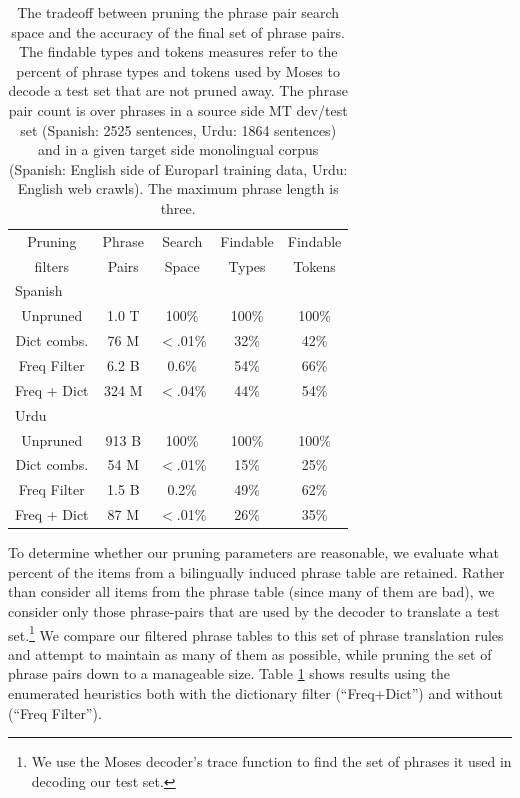 \documentclass[11pt]{article}
\begin{document}
\begin{table}
\small
\begin{center}
\begin{tabular}{|c|c|c|c|c|}
\hline
Pruning 	& Phrase	& Search & 	Findable 	& Findable \\
filters	& Pairs	&  Space & Types 	&  Tokens \\
\hline
\hline
\multicolumn{5}{|l|}{Spanish} \\
\hline
Unpruned & 1.0 T & 100\% & 100\% & 100\% \\
Dict combs. & 76 M & $<$.01\% & 32\% & 42\% \\
Freq Filter &  6.2 B & 0.6\% & 54\% & 66\% \\
Freq + Dict & 324 M & $<$.04\% & 44\% & 54\% \\
\hline
\hline
\multicolumn{5}{|l|}{Urdu} \\
\hline
Unpruned & 913 B & 100\% & 100\% & 100\% \\
Dict combs. & 54 M & $<$.01\% & 15\% & 25\% \\
Freq Filter & 1.5 B & 0.2\% & 49\% & 62\% \\
Freq + Dict & 87 M & $<$.01\% & 26\% & 35\% \\
\hline
\end{tabular}
\caption{The tradeoff between pruning the phrase pair search space and the accuracy of the final set of phrase pairs. The findable types and tokens measures refer to the percent of phrase types and tokens used by Moses to decode a test set that are not pruned away. The phrase pair count is over phrases in a source side MT dev/test set (Spanish: 2525 sentences, Urdu: 1864 sentences) and in a given target side monolingual corpus (Spanish: English side of Europarl training data, Urdu: English web crawls). The maximum phrase length is three.}\label{table:prune}
\end{center}
\end{table}


To determine whether our pruning parameters are reasonable, we evaluate what percent of the items from a bilingually induced phrase table are retained.  Rather than consider all items from the phrase table (since many of them are bad), we consider only those phrase-pairs that are used by the decoder to translate a test set.\footnote{We use the Moses decoder's trace function to find the set of phrases it used in decoding our test set.} We compare our filtered phrase tables to this set of phrase translation rules and attempt to maintain as many of them as possible, while pruning the set of phrase pairs down to a manageable size. Table \ref{table:prune} shows results using the enumerated heuristics both with the dictionary filter (``Freq+Dict'') and without (``Freq Filter'').
\end{document}
